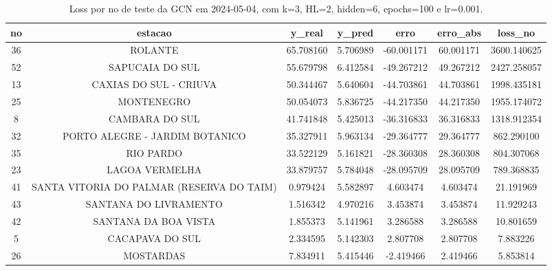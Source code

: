 \begin{table}[h]
\centering
\caption{Loss por no de teste da GCN em 2024-05-04, com k=3, HL=2, hidden=6, epochs=100 e lr=0.001.}
\label{tab:gcn_loss_k3_hl2_h6_e100_d20240504}
\begin{tabular}{ccccccc}
\toprule
no & estacao & y\_real & y\_pred & erro & erro\_abs & loss\_no \\
\midrule
36 & ROLANTE & 65.708160 & 5.706989 & -60.001171 & 60.001171 & 3600.140625 \\
52 & SAPUCAIA DO SUL & 55.679798 & 6.412584 & -49.267212 & 49.267212 & 2427.258057 \\
13 & CAXIAS DO SUL - CRIUVA & 50.344467 & 5.640604 & -44.703861 & 44.703861 & 1998.435181 \\
25 & MONTENEGRO & 50.054073 & 5.836725 & -44.217350 & 44.217350 & 1955.174072 \\
8 & CAMBARA DO SUL & 41.741848 & 5.425013 & -36.316833 & 36.316833 & 1318.912354 \\
32 & PORTO ALEGRE - JARDIM BOTANICO & 35.327911 & 5.963134 & -29.364777 & 29.364777 & 862.290100 \\
35 & RIO PARDO & 33.522129 & 5.161821 & -28.360308 & 28.360308 & 804.307068 \\
23 & LAGOA VERMELHA & 33.879757 & 5.784048 & -28.095709 & 28.095709 & 789.368835 \\
41 & SANTA VITORIA DO PALMAR (RESERVA DO TAIM) & 0.979424 & 5.582897 & 4.603474 & 4.603474 & 21.191969 \\
43 & SANTANA DO LIVRAMENTO & 1.516342 & 4.970216 & 3.453874 & 3.453874 & 11.929243 \\
42 & SANTANA DA BOA VISTA & 1.855373 & 5.141961 & 3.286588 & 3.286588 & 10.801659 \\
5 & CACAPAVA DO SUL & 2.334595 & 5.142303 & 2.807708 & 2.807708 & 7.883226 \\
26 & MOSTARDAS & 7.834911 & 5.415446 & -2.419466 & 2.419466 & 5.853814 \\
\bottomrule
\end{tabular}
\end{table}
